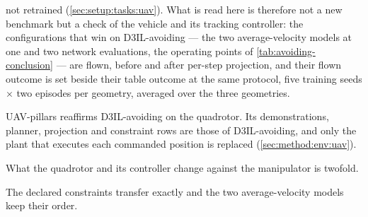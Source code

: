 
not retrained (\autoref{sec:setup:tasks:uav}). What is read here is therefore not a new benchmark but a
check of the vehicle and its tracking controller: the configurations that win on D3IL-avoiding --- the two
average-velocity models at one and two network evaluations, the operating points of
\autoref{tab:avoiding-conclusion} --- are flown, before and after per-step projection, and their flown
outcome is set beside their table outcome at the same protocol, five training seeds $\times$ two episodes
per geometry, averaged over the three geometries.

UAV-pillars reaffirms D3IL-avoiding on the quadrotor. Its demonstrations, planner, projection and constraint
rows are those of D3IL-avoiding, and only the plant that executes each commanded position is replaced
(\autoref{sec:method:env:uav}).

What the quadrotor and its controller change against the manipulator is twofold.


  \item[UAV-pillars: transfer of the D3IL-avoiding result to the quadrotor.] The declared constraints transfer exactly
    and the two average-velocity models keep their order.
